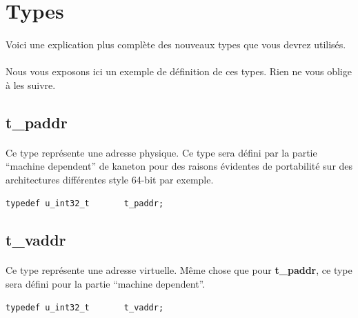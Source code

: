 \documentclass[10pt,a4wide]{article}
\begin{document}
\section{Types}

\paragraph{}

Voici une explication plus compl\`ete des nouveaux types que
vous devrez utilis\'es.

\paragraph{}

Nous vous exposons ici un exemple de d\'efinition de ces types. Rien ne vous
oblige \`a les suivre.

\subsection{t\_paddr}

\paragraph{}

Ce type repr\'esente une adresse physique. Ce type sera d\'efini par la
partie ``machine dependent'' de kaneton pour des raisons \'evidentes de
portabilit\'e sur des architectures diff\'erentes style 64-bit par exemple.

\begin{verbatim}
typedef u_int32_t       t_paddr;
\end{verbatim}

\subsection{t\_vaddr}

\paragraph{}

Ce type repr\'esente une adresse virtuelle. M\^eme chose que pour
\textbf{t\_paddr}, ce type sera d\'efini pour la partie ``machine dependent''.

\begin{verbatim}
typedef u_int32_t       t_vaddr;
\end{verbatim}
\end{document}

